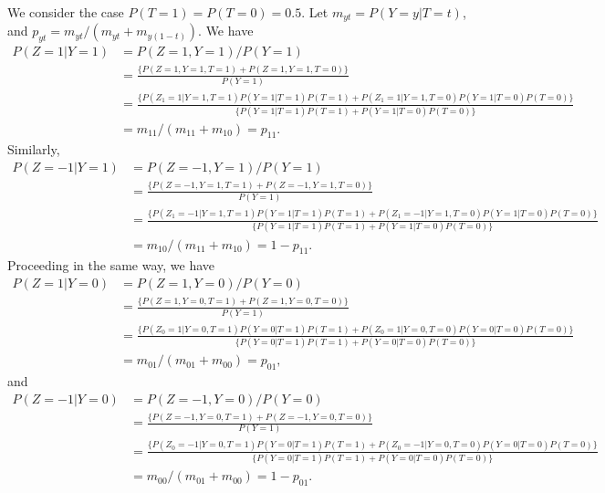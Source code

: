 \documentclass{article}
\begin{document}
We consider the case $P(T=1)=P(T=0) = 0.5$.
Let $m_{yt} = P( Y=y | T=t)$, and $p_{yt} = m_{yt} / ( m_{yt} + m_{y(1-t)})$.
We have
\begin{align*}
  P( Z = 1 | Y=1 )  & = P( Z =1 , Y=1 ) / P(Y = 1)  \\
   & = \tfrac{\biggl\{P( Z=1, Y=1, T=1 ) + P(Z=1, Y=1, T=0)\biggr\}}{ P(Y=1)} \\
  & = \tfrac{\biggl\{P(Z_1=1 | Y=1, T=1)P(Y=1 | T=1) P(T=1)  + P(Z_1=1 | Y=1, T=0)P(Y=1 | T=0) P(T=0) \biggr\}}
  {\biggl\{ P(Y=1|T=1)P(T=1) + P(Y=1 | T=0) P(T=0) \biggr\} } \\
   & = m_{11} / ( m_{11} + m_{10}) = p_{11}.
\end{align*}
Similarly,
\begin{align*}
  P( Z = -1 | Y=1 ) & = P( Z =-1 , Y=1 ) / P(Y = 1) \\
  & = \tfrac{\biggl\{P( Z=-1, Y=1, T=1 ) + P(Z=-1, Y=1, T=0)\biggr\}}{ P(Y=1)} \\
  & = \tfrac{\biggl\{P(Z_1=-1 | Y=1, T=1)P(Y=1 | T=1) P(T=1) + P(Z_1=-1 | Y=1, T=0)P(Y=1 | T=0) P(T=0) \biggr\}}
  {\biggl\{ P(Y=1|T=1)P(T=1) + P(Y=1 | T=0) P(T=0) \biggr\}} \\
  & = m_{10} / ( m_{11} + m_{10}) = 1 - p_{11}.
\end{align*}
Proceeding in the same way, we have
\begin{align*}
  P( Z = 1 | Y=0 ) & = P( Z =1 , Y=0 ) / P(Y = 0)  \\
  & = \tfrac{\biggl\{P( Z=1, Y=0, T=1 ) + P(Z=1, Y=0, T=0)\biggr\} }{ P(Y=1)} \\
  & = \tfrac{\biggl\{P(Z_0=1 | Y=0, T=1)P(Y=0 | T=1) P(T=1) + P(Z_0=1 | Y=0, T=0)P(Y=0 | T=0) P(T=0) \biggr\}}
  {\biggl\{ P(Y=0|T=1)P(T=1) + P(Y=0 | T=0) P(T=0) \biggr\}} \\
  & = m_{01} / ( m_{01} + m_{00}) = p_{01},
\end{align*}
and
\begin{align*}
  P( Z = -1 | Y=0 ) & = P( Z =-1 , Y=0 ) / P(Y = 0)  \\
  & = \tfrac{\biggl\{P( Z=-1, Y=0, T=1 ) + P(Z=-1, Y=0, T=0)\biggr\}}{ P(Y=1)} \\
  & = \tfrac{\biggl\{P(Z_0=-1 | Y=0, T=1)P(Y=0 | T=1) P(T=1) + P(Z_0=-1 | Y=0, T=0)P(Y=0 | T=0) P(T=0) \biggr\} }
  {\biggl\{ P(Y=0|T=1)P(T=1) + P(Y=0 | T=0) P(T=0) \biggr\} }\\
  & = m_{00} / ( m_{01} + m_{00}) = 1 - p_{01}.
\end{align*}
\end{document}
